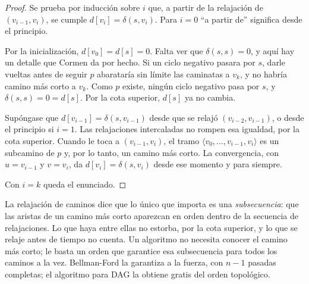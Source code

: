 \documentclass[11pt,letterpaper]{article}
\begin{document}
\begin{proof}
  Se prueba por inducción sobre $i$ que, a partir de la relajación de
  $(v_{i-1}, v_i)$, se cumple $d[v_i] = \delta(s, v_i)$. Para $i = 0$
  ``a partir de'' significa desde el principio.

   Por la inicialización, $d[v_0] = d[s] = 0$.
  Falta ver que $\delta(s, s) = 0$, y aquí hay un detalle que Cormen
  da por hecho. Si un ciclo negativo pasara por $s$, darle vueltas
  antes de seguir $p$ abarataría sin límite las caminatas a $v_k$, y
  no habría camino más corto a $v_k$. Como $p$ existe, ningún ciclo
  negativo pasa por $s$, y $\delta(s, s) = 0 = d[s]$. Por la cota
  superior, $d[s]$ ya no cambia.

   Supóngase que $d[v_{i-1}] = \delta(s, v_{i-1})$
  desde que se relajó $(v_{i-2}, v_{i-1})$, o desde el principio si
  $i = 1$. Las relajaciones intercaladas no rompen esa igualdad, por
  la cota superior. Cuando le toca a $(v_{i-1}, v_i)$, el tramo
  $\langle v_0, \dots, v_{i-1}, v_i \rangle$ es un subcamino de $p$ y,
  por lo tanto, un camino más corto. La convergencia, con
  $u = v_{i-1}$ y $v = v_i$, da $d[v_i] = \delta(s, v_i)$ desde ese
  momento y para siempre.

  Con $i = k$ queda el enunciado.
\end{proof}

\begin{idea}
  La relajación de caminos dice que lo único que importa es una
  \emph{subsecuencia}: que las aristas de un camino más corto
  aparezcan en orden dentro de la secuencia de relajaciones. Lo que
  haya entre ellas no estorba, por la cota superior, y lo que se
  relaje antes de tiempo no cuenta. Un algoritmo no necesita conocer
  el camino más corto; le basta un orden que garantice esa
  subsecuencia para todos los caminos a la vez. Bellman-Ford la
  garantiza a la fuerza, con $n - 1$ pasadas completas; el algoritmo
  para DAG la obtiene gratis del orden topológico.
\end{idea}
\end{document}
